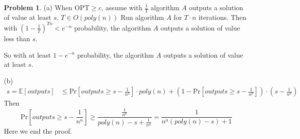 \documentclass[a4paper]{article}
\theoremstyle{definition}
\newtheorem{problem}{Problem}
\theoremstyle{plain}
\newcommand{\Ebb}{\mathbb E}
\newcommand{\OPT}{\mathrm{OPT}}
\numberwithin{equation}{problem}
\begin{document}
\begin{problem}
    (a) When  $ \OPT \geq c $, assume with  $ \frac{1}{T} $ algorithm  $ A $  outputs a solution of value at least  $ s $.  $ T\in O(poly(n)) $  Run algorithm  $ A $ for  $ T\cdot n $ iterations. Then with  $ (1-\frac{1}{T})^{Tn}<e^{-n} $ probability, the algorithm  $ A $  outputs a solution of value less than  $ s $.

    So with at least  $ 1-e^{-n} $ probability, the algorithm  $ A $  outputs a solution of value at least  $ s $.

    (b)
    \[\begin{aligned}
        s=\Ebb[outputs]& \leq \mathrm{Pr}[outputs \geq s-\frac{1}{n^a}]\cdot poly(n)+(1-\mathrm{Pr}[outputs \geq s-\frac{1}{n^a}])\cdot (s-\frac{1}{n^a})
    \end{aligned}\]
    Then
    \[\mathrm{Pr}[outputs \geq s-\frac{1}{n^a}]  \geq \frac{\frac{1}{n^a}}{poly(n)-s+\frac{1}{n^a}}=\frac{1}{n^a (poly(n)-s)+1}\]
    Here we end the proof.
\end{problem}
\end{document}
